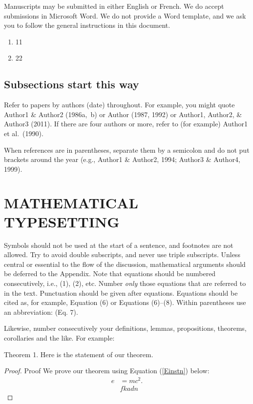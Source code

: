 \documentclass[12pt]{TD-CJS}
\begin{document}
Manuscripts may be submitted in either English or French.  We do accept submissions in Microsoft Word.  We do not provide a Word template, and we ask you to follow the general instructions in this document.
\begin{enumerate}[1]
    \item 11
    \item 22
\end{enumerate}

\subsection{Subsections start this way}
Refer to papers by authors (date) throughout. For example,
you might quote Author1 \& Author2 (1986a,~b) or Author (1987, 1992) or 
Author1, Author2, \& Author3 (2011). If there
are four authors or more, refer to (for example) Author1 et al.\ (1990).

When references are in parentheses, separate them by a semicolon and do not
put brackets around the year (e.g., Author1 \& Author2, 1994; Author3 \&
Author4, 1999).

\section{MATHEMATICAL TYPESETTING}
Symbols should not be used at the start of a sentence, and footnotes are not allowed. Try to avoid double subscripts, and never use triple subscripts. Unless central or essential to the flow of the discussion, mathematical arguments should be deferred to the Appendix.
Note that equations should be numbered consecutively, i.e., (1), (2), etc. Number
\textit{only} those equations that are referred to in the text.  Punctuation should be given after equations. Equations should be cited as, for example, Equation (6) or Equations (6)--(8). Within parentheses use an abbreviation: (Eq. 7).

Likewise, number consecutively your definitions, lemmas, propositions,
theorems, corollaries and the like. For example:

\begin{theorem}{Theorem 1.}{}%
Here is the statement of our theorem.
\end{theorem}
\begin{proof}{Proof}{}%
We prove our theorem using Equation (\ref{Einstn}) below:
\begin{align}
e &= mc^2.\\
&fkadn
\label{Einstn}
\end{align}
\end{proof}
\end{document}
